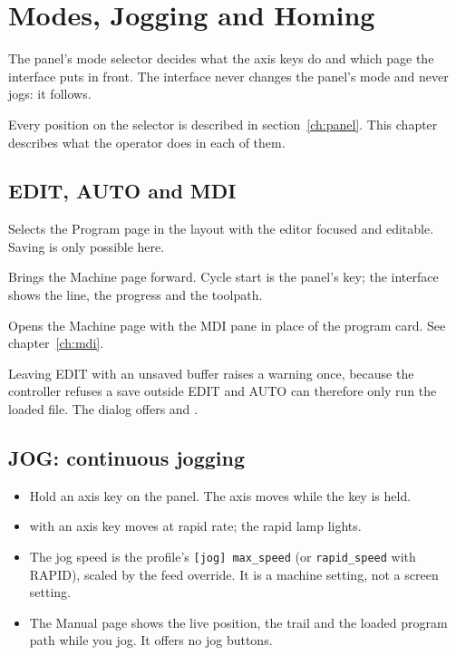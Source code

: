 \chapter{Modes, Jogging and Homing}
\label{ch:modes}

The panel's mode selector decides what the axis keys do and which page the interface puts
in front. The interface never changes the panel's mode and never jogs: it follows.

\begin{notebox}
  Every position on the selector is described in section~\ref{ch:panel}. This chapter
  describes what the operator does in each of them.
\end{notebox}

\section{EDIT, AUTO and MDI}

\begin{description}[font=\normalfont\sffamily\bfseries, leftmargin=2.6cm, style=nextline]
  \item[EDIT] Selects the Program page in the  layout with the editor focused and
        editable. Saving is only possible here.
  \item[AUTO] Brings the Machine page forward. Cycle start is the panel's key; the interface
        shows the line, the progress and the toolpath.
  \item[MDI] Opens the Machine page with the MDI pane in place of the program card. See
        chapter~\ref{ch:mdi}.
\end{description}

Leaving EDIT with an unsaved buffer raises a warning once, because the controller refuses a
save outside EDIT and AUTO can therefore only run the loaded file. The dialog offers
 and .

\section{JOG: continuous jogging}

\begin{itemize}
  \item Hold an axis key on the panel. The axis moves while the key is held.
  \item {} with an axis key moves at rapid rate; the rapid lamp lights.
  \item The jog speed is the profile's \texttt{[jog] max\_speed} (or \texttt{rapid\_speed}
        with RAPID), scaled by the feed override. It is a machine setting, not a screen
        setting.
  \item The Manual page shows the live position, the trail and the loaded program path while
        you jog. It offers no jog buttons.
\end{itemize}

